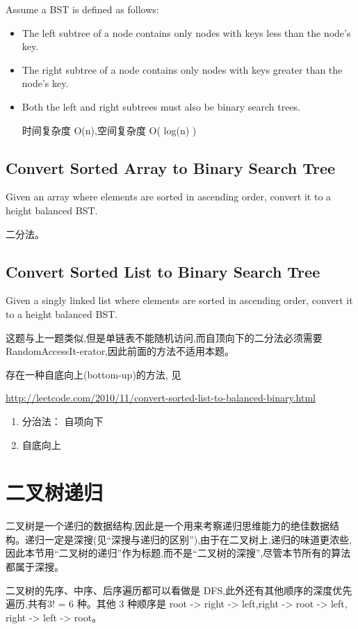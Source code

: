 \documentclass[12pt]{book}
\begin{document}
Assume a BST is defined as follows:
\begin{itemize}
\item The left subtree of a node contains only nodes with keys less than the node's key.
\item The right subtree of a node contains only nodes with keys greater than the node's key.
\item Both the left and right subtrees must also be binary search trees.

时间复杂度 O(n),空间复杂度 O( log(n) )
\end{itemize}

\subsection{Convert Sorted Array to Binary Search Tree}
\label{sec-4-3-2}
Given an array where elements are sorted in ascending order, convert it to a height balanced BST.

二分法。
\subsection{Convert Sorted List to Binary Search Tree}
\label{sec-4-3-3}
Given a singly linked list where elements are sorted in ascending order, convert it to a height balanced BST.

这题与上一题类似,但是单链表不能随机访问,而自顶向下的二分法必须需要 RandomAccessIt-erator,因此前面的方法不适用本题。

存在一种自底向上(bottom-up)的方法, 见 

\url{http://leetcode.com/2010/11/convert-sorted-list-to-balanced-binary.html}
\begin{enumerate}
\item 分治法： 自项向下
\label{sec-4-3-3-1}
\item 自底向上
\label{sec-4-3-3-2}
\end{enumerate}
\section{二叉树递归}
\label{sec-4-4}
二叉树是一个递归的数据结构,因此是一个用来考察递归思维能力的绝佳数据结构。递归一定是深搜(见“深搜与递归的区别”),由于在二叉树上,递归的味道更浓些,因此本节用“二叉树的递归”作为标题,而不是“二叉树的深搜”,尽管本节所有的算法都属于深搜。

二叉树的先序、中序、后序遍历都可以看做是 DFS,此外还有其他顺序的深度优先遍历,共有3! = 6 种。其他 3 种顺序是 root -> right -> left,right -> root -> left, right -> left -> root。
\end{document}
